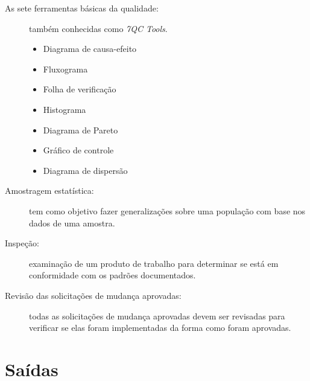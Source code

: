 \begin{description}
	
	\item[As sete ferramentas básicas da qualidade:] também conhecidas como \textit{7QC Tools}.
	
	\begin{itemize}
		\item Diagrama de causa-efeito
		\item Fluxograma
		\item Folha de verificação
		\item Histograma
		\item Diagrama de Pareto
		\item Gráfico de controle
		\item Diagrama de dispersão			
	\end{itemize}
	
	\item[Amostragem estatística:] tem como objetivo fazer generalizações sobre uma população com base nos dados de uma amostra.
	
	\item[Inspeção:] examinação de um produto de trabalho para determinar se está em conformidade com os padrões documentados.
	
	\item[Revisão das solicitações de mudança aprovadas:] todas as solicitações de mudança aprovadas devem ser revisadas para verificar se elas foram implementadas da forma como foram aprovadas.
	
\end{description}

\section{Saídas}

